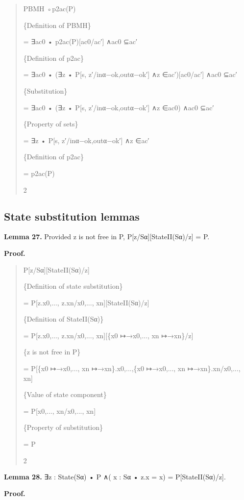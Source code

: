 \documentclass[11pt]{article}
\begin{document}
\begin{quote}\small\raggedright
PBMH ◦p2ac(P)
\par
\{Definition of PBMH\}
\par
= ∃ac0 • p2ac(P)[ac0/ac′] ∧ac0 ⊆ac′
\par
\{Definition of p2ac\}
\par
= ∃ac0 • (∃z • P[s, z′/inα−ok,outα−ok′] ∧z ∈ac′)[ac0/ac′] ∧ac0 ⊆ac′
\par
\{Substitution\}
\par
= ∃ac0 • (∃z • P[s, z′/inα−ok,outα−ok′] ∧z ∈ac0) ∧ac0 ⊆ac′
\par
\{Property of sets\}
\par
= ∃z • P[s, z′/inα−ok,outα−ok′] ∧z ∈ac′
\par
\{Definition of p2ac\}
\par
= p2ac(P)
\par
2
\end{quote}

\subsection{State substitution lemmas}
\noindent\textbf{Lemma 27.} Provided z is not free in P, P[z/Sα][StateII(Sα)/z] = P.


\noindent\textbf{Proof.}


\begin{quote}\small\raggedright
P[z/Sα][StateII(Sα)/z]
\par
\{Definition of state substitution\}
\par
= P[z.x0,..., z.xn/x0,..., xn][StateII(Sα)/z]
\par
\{Definition of StateII(Sα)\}
\par
= P[z.x0,..., z.xn/x0,..., xn][\{x0 ↦→x0,..., xn ↦→xn\}/z]
\par
\{z is not free in P\}
\par
= P[\{x0 ↦→x0,..., xn ↦→xn\}.x0,...,\{x0 ↦→x0,..., xn ↦→xn\}.xn/x0,..., xn]
\par
\{Value of state component\}
\par
= P[x0,..., xn/x0,..., xn]
\par
\{Property of substitution\}
\par
= P
\par
2
\end{quote}

\noindent\textbf{Lemma 28.} ∃z : State(Sα) • P ∧( x : Sα • z.x = x) = P[StateII(Sα)/z].


\noindent\textbf{Proof.}
\end{document}
